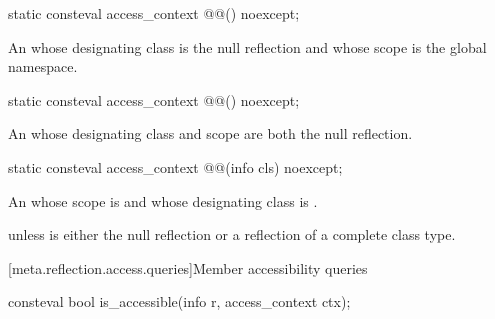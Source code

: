 \begin{itemdecl}
static consteval access_context @@() noexcept;
\end{itemdecl}

\begin{itemdescr}
\pnum
\returns
An  whose designating class is the null reflection
and whose scope is the global namespace.
\end{itemdescr}

\begin{itemdecl}
static consteval access_context @@() noexcept;
\end{itemdecl}

\begin{itemdescr}
\pnum
\returns
An  whose designating class and scope
are both the null reflection.
\end{itemdescr}

\begin{itemdecl}
static consteval access_context @@(info cls) noexcept;
\end{itemdecl}

\begin{itemdescr}
\pnum
\returns
An  whose scope is 
and whose designating class is .

\pnum
\throws
{} unless
 is either the null reflection
or a reflection of a complete class type.
\end{itemdescr}

[meta.reflection.access.queries]{Member accessibility queries}

%
\begin{itemdecl}
consteval bool is_accessible(info r, access_context ctx);
\end{itemdecl}


